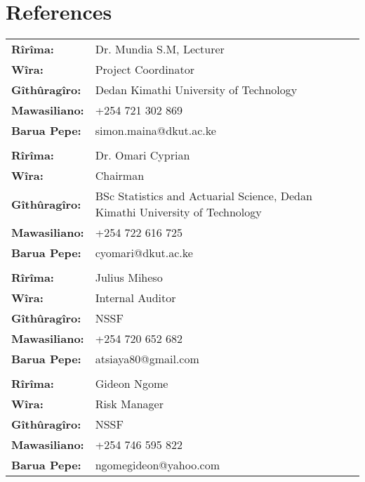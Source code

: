 \documentclass[11pt,a4paper,sans,swahili]{moderncv}
\begin{document}
	\section{References}
	\begin{center}
		\begin{tabular}{p{6cm}p{8cm}}
			\textbf{Rîrîma:} & Dr. Mundia S.M, Lecturer\\
			\textbf{Wîra:} & Project Coordinator\\
			\textbf{Gîthûragîro:} & Dedan Kimathi University of Technology \\
			\textbf{Mawasiliano:} & +254 721 302 869\\
			\textbf{Barua Pepe:} & simon.maina@dkut.ac.ke \\
			\\
			\textbf{Rîrîma:} & Dr. Omari Cyprian \\
			\textbf{Wîra:} & Chairman \\
			\textbf{Gîthûragîro:} & BSc Statistics and Actuarial Science, Dedan Kimathi University of Technology \\
			\textbf{Mawasiliano:} & +254 722 616 725 \\
			\textbf{Barua Pepe:} & cyomari@dkut.ac.ke \\
			\\
			\textbf{Rîrîma:} & Julius Miheso \\
			\textbf{Wîra:} & Internal Auditor \\
			\textbf{Gîthûragîro:} & NSSF \\
			\textbf{Mawasiliano:} & +254 720 652 682 \\
			\textbf{Barua Pepe:} & atsiaya80@gmail.com \\
			\\
			\textbf{Rîrîma:} & Gideon Ngome \\
			\textbf{Wîra:} & Risk Manager \\
			\textbf{Gîthûragîro:} & NSSF \\
			\textbf{Mawasiliano:} & +254 746 595 822 \\
			\textbf{Barua Pepe:} & ngomegideon@yahoo.com \\
		\end{tabular}
	\end{center}
	
\end{document}
